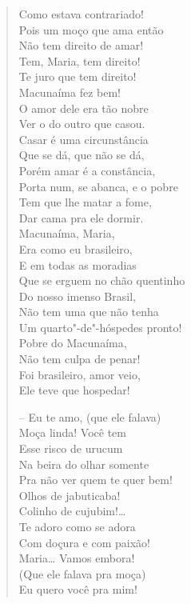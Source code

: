 \begin{verse}
Como estava contrariado!\\
Pois um moço que ama então\\
Não tem direito de amar!\\
Tem, Maria, tem direito!\\
Te juro que tem direito!\\
Macunaíma fez bem!\\
O amor dele era tão nobre\\
Ver o do outro que casou.\\
Casar é uma circunstância\\
Que se dá, que não se dá,\\
Porém amar é a constância,\\
Porta num, se abanca, e o pobre\\
Tem que lhe matar a fome,\\
Dar cama pra ele dormir.\\
Macunaíma, Maria,\\
Era como eu brasileiro,\\
E em todas as moradias\\
Que se erguem no chão quentinho\\
Do nosso imenso Brasil,\\
Não tem uma que não tenha\\
Um quarto"-de"-hóspedes pronto!\\
Pobre do Macunaíma,\\
Não tem culpa de penar!\\
Foi brasileiro, amor veio,\\
Ele teve que hospedar!

-- Eu te amo, (que ele falava)\\
Moça linda! Você tem\\
Esse risco de urucum\\
Na beira do olhar somente\\
Pra não ver quem te quer bem!\\
Olhos de jabuticaba!\\
Colinho de cujubim!\ldots{}\\
Te adoro como se adora\\
Com doçura e com paixão!\\
Maria\ldots{} Vamos embora!\\
(Que ele falava pra moça)\\
Eu quero você pra mim!


\end{verse}
